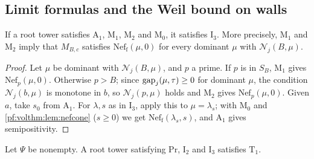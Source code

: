 \subsection{Limit formulas and the Weil bound on walls}\label{pf:volthm:sec:weil}

\begin{proposition}[$\mathrm{I}_3$]\label{pf:volthm:prop:I3}
If a root tower satisfies $\mathrm{A}_1$, $\mathrm{M}_1$, $\mathrm{M}_2$ and $\mathrm{M}_0$, it satisfies
$\mathrm{I}_3$. More precisely, $\mathrm{M}_1$ and $\mathrm{M}_2$ imply that $M_{B,c}$ satisfies
$\mathrm{Nef}_{\mathrm f}(\mu,0)$ for every dominant $\mu$ with $\mathcal N_j(B,\mu)$.
\end{proposition}

\begin{proof}
Let $\mu$ be dominant with $\mathcal N_j(B,\mu)$, and $p$ a prime. If $p$ is in $S_B$, $\mathrm{M}_1$ gives
$\mathrm{Nef}_p(\mu,0)$. Otherwise $p>B$; since $\mathrm{gap}_j(\mu,\tau)\ge0$ for dominant $\mu$, the condition
$\mathcal N_j(b,\mu)$ is monotone in $b$, so $\mathcal N_j(p,\mu)$ holds and $\mathrm{M}_2$ gives
$\mathrm{Nef}_p(\mu,0)$. Given $a$, take $s_0$ from $\mathrm{A}_1$. For $\lambda,s$ as in $\mathrm{I}_3$, apply
this to $\mu=\lambda_s$; with $\mathrm{M}_0$ and \cref{pf:volthm:lem:nefcone} ($s\ge0$) we get
$\mathrm{Nef}_{\mathrm f}(\lambda_s,s)$, and $\mathrm{A}_1$ gives semipositivity.
\end{proof}

\begin{proposition}\label{pf:volthm:prop:T1}
Let $\Psi$ be nonempty. A root tower satisfying $\mathrm{Pr}$, $\mathrm{I}_2$ and $\mathrm{I}_3$
satisfies $\mathrm{T}_1$.
\end{proposition}

